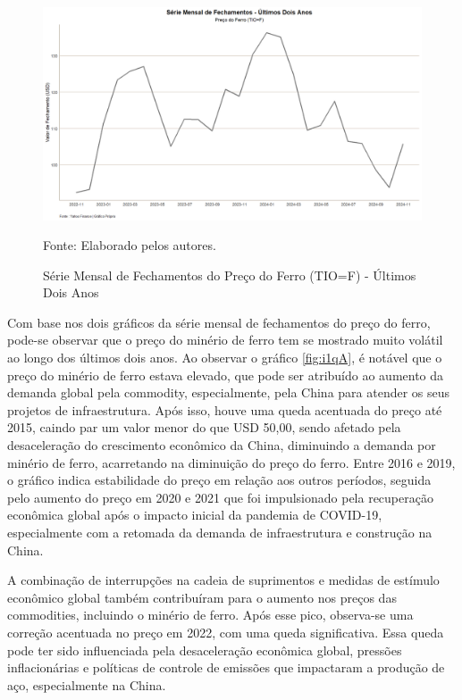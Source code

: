\documentclass[a4paper,12pt]{article}[abntex2]
\begin{document}
\begin{figure}[H]
    \centering
    \caption{Série Mensal de Fechamentos do Preço do Ferro (TIO=F) - Últimos Dois Anos} 
    \includegraphics[width=1.0\textwidth]{APS 2/i2qA.png}
    \label{fig:i2qA}
    
    \footnotesize{Fonte: Elaborado pelos autores.}
    \end{figure}    
Com base nos dois gráficos da série mensal de fechamentos do preço do ferro, pode-se observar que o preço do minério de ferro tem se mostrado muito volátil ao longo dos últimos dois anos. 
Ao observar o gráfico \ref{fig:i1qA}, é notável que o preço do minério de ferro estava elevado, que pode ser atribuído ao aumento da demanda global pela commodity, especialmente, pela China para atender os seus projetos de infraestrutura. Após isso, houve uma queda acentuada do preço até 2015, caindo par um valor menor do que USD 50,00, sendo afetado pela desaceleração do crescimento econômico da China, diminuindo a demanda por minério de ferro, acarretando na diminuição do preço do ferro. 
Entre 2016 e 2019, o gráfico indica estabilidade do preço em relação aos outros períodos, seguida pelo aumento do preço em 2020 e 2021 que foi impulsionado pela recuperação econômica global após o impacto inicial da pandemia de COVID-19, especialmente com a retomada da demanda de infraestrutura e construção na China. 

A combinação de interrupções na cadeia de suprimentos e medidas de estímulo econômico global também contribuíram para o aumento nos preços das commodities, incluindo o minério de ferro. Após esse pico, observa-se uma correção acentuada no preço em 2022, com uma queda significativa. Essa queda pode ter sido influenciada pela desaceleração econômica global, pressões inflacionárias e políticas de controle de emissões que impactaram a produção de aço, especialmente na China.
\end{document}
